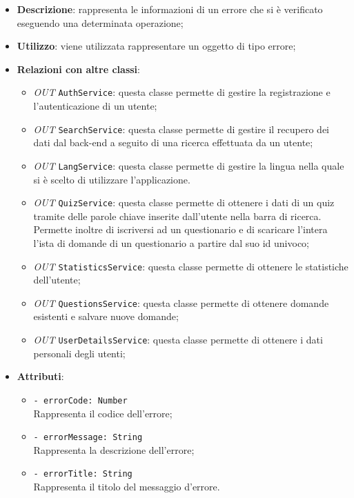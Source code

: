 		\begin{itemize}
			\item \textbf{Descrizione}: rappresenta le informazioni di un errore che si è verificato eseguendo una determinata operazione;
			\item \textbf{Utilizzo}: viene utilizzata rappresentare un oggetto di tipo errore;
			\item \textbf{Relazioni con altre classi}: 
			\begin{itemize}
			 	\item \textit{OUT} \texttt{AuthService}: questa classe permette di gestire la registrazione e l'autenticazione di un utente;
			 	\item \textit{OUT} \texttt{SearchService}: questa classe permette di gestire il recupero dei dati dal back-end a seguito di una ricerca effettuata da un utente;
			 	\item \textit{OUT} \texttt{LangService}: questa classe permette di gestire la lingua nella quale si è scelto di utilizzare l'applicazione.
			 	\item \textit{OUT} \texttt{QuizService}: questa classe permette di ottenere i dati di un quiz tramite delle parole chiave inserite dall'utente nella barra di ricerca. Permette inoltre di iscriversi ad un questionario e di scaricare l'intera l'ista di domande di un questionario a partire dal suo id univoco;
			 	\item \textit{OUT} \texttt{StatisticsService}: questa classe permette di ottenere le statistiche dell'utente;
		 		\item \textit{OUT} \texttt{QuestionsService}: questa classe permette di ottenere domande esistenti e salvare nuove domande;
	 			\item \textit{OUT} \texttt{UserDetailsService}: questa classe permette di ottenere i dati personali degli utenti;
			\end{itemize}
			\item \textbf{Attributi}: 
			\begin{itemize}
				\item \texttt{- errorCode: Number} \\ 
				Rappresenta il codice dell'errore;
				\item \texttt{- errorMessage: String} \\ 
				Rappresenta la descrizione dell'errore; 
				\item \texttt{- errorTitle: String}\\ 
				Rappresenta il titolo del messaggio d'errore.
			\end{itemize}

\end{itemize}
